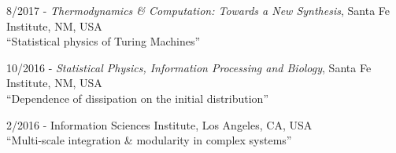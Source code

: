 \documentclass[margin,line,centered]{res}
\begin{document}
\begin{resume}
8/2017 - \emph{Thermodynamics \& Computation: Towards a New Synthesis}, Santa Fe Institute, NM, USA\\
``Statistical physics of Turing Machines'' %

10/2016 - \emph{Statistical Physics, Information Processing and Biology}, Santa Fe Institute, NM, USA \\
``Dependence of dissipation on the initial distribution'' %

2/2016 - Information Sciences Institute, Los Angeles, CA, USA\\
``Multi-scale integration \& modularity in complex systems'' %












\end{resume}
\end{document}
